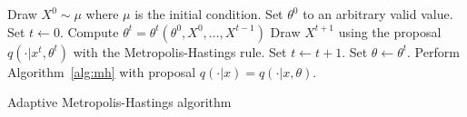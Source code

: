 \begin{algorithm}
\begin{algorithmic}
  \tophrule
  \STATE Draw $X^0\sim\mu$ where $\mu$ is the initial condition.
  \STATE Set $\theta^0$ to an arbitrary valid value.
  \STATE Set $t\leftarrow0$.
  \REPEAT
      \STATE Compute $\theta^t = \theta^t(\theta^0,X^0,\dots,X^{t-1})$
      \STATE Draw $X^{t + 1}$ using the proposal $q(\cdot|x^t,\theta^t)$ with
      the Metropolis-Hastings rule.
      \STATE Set $t\leftarrow t+1$.
  \STATE Set $\theta\leftarrow\theta^t$.
  \STATE Perform Algorithm~\ref{alg:mh} with proposal $q(\cdot|x) =
  q(\cdot|x,\theta)$.
  \bottomhrule
\end{algorithmic}
\caption{Adaptive Metropolis-Hastings algorithm}
\label{alg:adaptive rw}
\end{algorithm}
